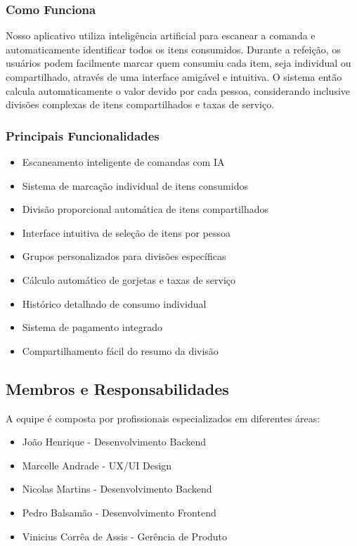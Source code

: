 \documentclass[12pt,a4paper]{article}
\begin{document}
\subsubsection{Como Funciona}
Nosso aplicativo utiliza inteligência artificial para escanear a comanda e automaticamente identificar todos os itens consumidos. Durante a refeição, os usuários podem facilmente marcar quem consumiu cada item, seja individual ou compartilhado, através de uma interface amigável e intuitiva. O sistema então calcula automaticamente o valor devido por cada pessoa, considerando inclusive divisões complexas de itens compartilhados e taxas de serviço.

\subsubsection{Principais Funcionalidades}
\begin{itemize}
    \item Escaneamento inteligente de comandas com IA
    \item Sistema de marcação individual de itens consumidos
    \item Divisão proporcional automática de itens compartilhados
    \item Interface intuitiva de seleção de itens por pessoa
    \item Grupos personalizados para divisões específicas
    \item Cálculo automático de gorjetas e taxas de serviço
    \item Histórico detalhado de consumo individual
    \item Sistema de pagamento integrado
    \item Compartilhamento fácil do resumo da divisão
\end{itemize}

\subsection{Membros e Responsabilidades}
A equipe é composta por profissionais especializados em diferentes áreas:

\begin{itemize}
    \item João Henrique - Desenvolvimento Backend
    \item Marcelle Andrade - UX/UI Design
    \item Nicolas Martins - Desenvolvimento Backend
    \item Pedro Balsamão - Desenvolvimento Frontend
    \item Vinicius Corrêa de Assis - Gerência de Produto
\end{itemize}
\end{document}
